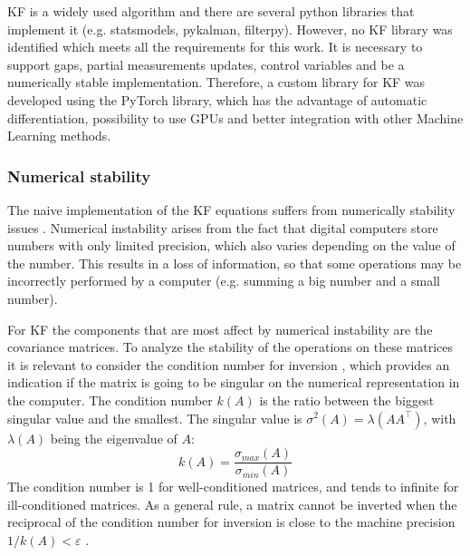 \documentclass{article}
\begin{document}

KF is a widely used algorithm and there are several python libraries that implement it (e.g. \textsf{statsmodels}, \textsf{pykalman}, \textsf{filterpy}). However, no  KF library was identified which meets all the requirements for this work. It is necessary to support gaps, partial measurements updates, control variables and be a numerically stable implementation.
Therefore, a custom library for KF was developed using the \textsf{PyTorch} library, which has the advantage of automatic differentiation, possibility to use GPUs and better integration with other Machine Learning methods.

\subsubsection{Numerical stability}

The naive implementation of the KF equations suffers from numerically stability issues \cite{mohinder_s_grewal_kalman_2001, dan_simon_optimal_2006}. %
Numerical instability arises from the fact that digital computers store numbers with only limited precision, which also varies depending on the value of the number. This results in a loss of information, so that some operations may be incorrectly performed by a  computer (e.g. summing a big number and a small number).

For KF the components that are most affect by numerical instability are the covariance matrices. To analyze the stability of the operations on these matrices it is relevant to consider the condition number for inversion \cite{mohinder_s_grewal_kalman_2001, kaminski_discrete_1971}, which provides an indication if the matrix is going to be singular on the numerical representation in the computer. The condition number $k(A)$ is the ratio between the biggest singular value and the smallest. The singular value is $\sigma^2(A) = \lambda(AA^\top)$, with  $\lambda(A)$ being the eigenvalue of $A$:
\begin{equation*}%
    k(A) = \frac{\sigma_{max}(A)}{\sigma_{min}(A)}
\end{equation*}
The condition number is 1 for well-conditioned matrices, and tends to infinite for ill-conditioned matrices. As a general rule,  a matrix cannot be inverted when the reciprocal of the condition number for inversion is close to the machine precision $ 1/k(A) < \varepsilon$ \cite{mohinder_s_grewal_kalman_2001}.
\end{document}
